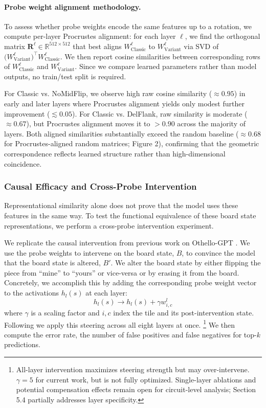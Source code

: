 \documentclass{article}
\theoremstyle{plain}
\theoremstyle{definition}
\theoremstyle{remark}
\begin{document}
\paragraph{Probe weight alignment methodology.}
To assess whether probe weights encode the same features up to a rotation, we compute per-layer Procrustes alignment:
for each layer $\ell$, we find the orthogonal matrix $\mathbf{R}^{\ell} \in \mathbb{R}^{512\times512}$ that best aligns
$W^{\ell}_{\text{Classic}}$ to $W^{\ell}_{\text{Variant}}$ via SVD of
$\bigl(W^{\ell}_{\text{Variant}}\bigr)^\top W^{\ell}_{\text{Classic}}$.
We then report cosine similarities between corresponding rows of
$W^{\ell}_{\text{Classic}}$ and $W^{\ell}_{\text{Variant}}$.
Since we compare learned parameters rather than model outputs, no train/test split is required.

For Classic vs. NoMidFlip, we observe high raw cosine similarity ($\approx 0.95$) in early and later layers where Procrustes alignment yields only modest further improvement ($\lesssim 0.05$). For Classic vs. DelFlank, raw similarity is moderate ($\approx 0.67$), but Procrustes alignment moves it to $> 0.90$ across the majority of layers. Both aligned similarities substantially exceed the random baseline ($\approx0.68$ for Procrustes-aligned random matrices; Figure 2), confirming that the geometric correspondence reflects learned structure rather than high-dimensional coincidence.

\subsubsection{Causal Efficacy and Cross-Probe Intervention}
Representational similarity alone does not prove that the model uses these features in the same way. To test the functional equivalence of these board state representations, we perform a cross-probe intervention experiment.

We replicate the causal intervention from previous work on Othello-GPT \cite{nanda_emergent_2023, li_emergent_2024}. We use the probe weights to intervene on the board state, $B$, to convince the model that the board state is altered, $B'$. We alter the board state by either flipping the piece from ``mine'' to ``yours'' or vice-versa or by erasing it from the board. Concretely, we accomplish this by adding the corresponding probe weight vector to the activations $h_l(s)$ at each layer: 
\begin{equation}
    h_l(s) \rightarrow h_l(s) + \gamma w^{l}_{i,c}
\end{equation}
where $\gamma$ is a scaling factor and $i, c$ index the tile and its post-intervention state. Following \cite{nanda_emergent_2023} we apply this steering across all eight layers at once. \footnote{All-layer intervention maximizes steering strength but may over-intervene. $\gamma = 5$ for current work, but is not fully optimized. Single-layer ablations and potential compensation effects \citep{mcgrath_hydra_2023} remain open for circuit-level analysis; Section 5.4 partially addresses layer specificity.} We then compute the error rate, the number of false positives and false negatives for top-$k$ predictions. 
\end{document}
